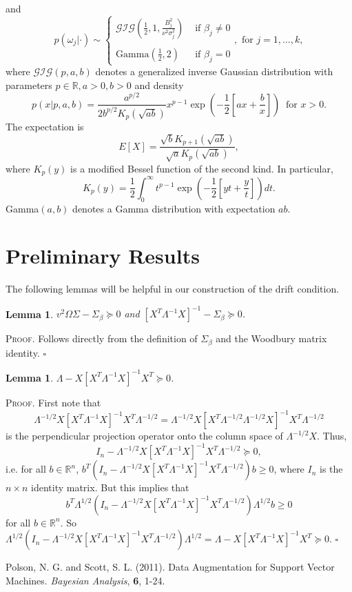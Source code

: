 \documentclass[12pt]{article}
\newtheorem{lemma}[theorem]{Lemma}
\newcounter{ProofCounter}
\newenvironment{Proof}{\stepcounter{ProofCounter}\textsc{Proof.}}{\hfill$\square$}
\begin{document}
and 
\[
  p(\omega_j|\cdot) \sim \left\{ \begin{array}{cl}
      \mathcal{GIG}\left( \frac{1}{2}, 1, \frac{B_j^2}{\nu^2\sigma_j^2} \right) & \text{ if } \beta_j \neq 0 \\ \\
      \text{Gamma}\left( \frac{1}{2}, 2 \right) & \text{ if } \beta_j = 0
  \end{array} \right.,
  \text{ for } j=1,\dots,k,
\]
where $\mathcal{GIG}(p, a, b)$ denotes a generalized inverse Gaussian distribution with parameters $p \in \mathbb{R}, a > 0, b > 0$ and density
\[
  p(x|p, a, b) = \frac{a^{p/2}}{2b^{p/2}K_{p}(\sqrt{ab})}x^{p - 1}\exp\left( -\frac{1}{2}\left[ ax + \frac{b}{x} \right] \right) \ \text{ for } x > 0.
\]
The expectation is
\[
  E[X] = \frac{\sqrt{b}K_{p+1}(\sqrt{ab})}{\sqrt{a}K_{p}(\sqrt{ab})},
\]
where $K_{p}(y)$ is a modified Bessel function of the second kind. In particular, 
\[
  K_p(y) = \frac{1}{2} \int_{0}^{\infty} t^{p-1}\exp\left( -\frac{1}{2}\left[yt + \frac{y}{t}\right] \right) dt.
\]
Gamma$(a,b)$ denotes a Gamma distribution with expectation $ab$.


\section{Preliminary Results}

The following lemmas will be helpful in our construction of the drift condition. \\

\begin{lemma}
  $v^2 \Omega \Sigma - \Sigma_{\beta} \succeq 0$ and $[X^T \Lambda^{-1}X]^{-1} - \Sigma_{\beta} \succeq 0$.
  \label{l1}
\end{lemma}
\begin{Proof}
  Follows directly from the definition of $\Sigma_{\beta}$ and the Woodbury matrix identity.
\end{Proof} \\

\begin{lemma}
  $\Lambda - X[X^T \Lambda^{-1} X]^{-1} X^T \succeq 0$.
  \label{l2}
\end{lemma}
\begin{Proof}
  First note that 
  \[
    \Lambda^{-1/2}X[X^T \Lambda^{-1} X]^{-1} X^T \Lambda^{-1/2} = \Lambda^{-1/2}X[X^T \Lambda^{-1/2}\Lambda^{-1/2} X]^{-1} X^T \Lambda^{-1/2}
  \]
  is the perpendicular projection operator onto the column space of $\Lambda^{-1/2}X$. Thus, 
  \[
    I_n - \Lambda^{-1/2}X[X^T \Lambda^{-1} X]^{-1} X^T \Lambda^{-1/2}  \succeq 0,
  \]
  i.e. for all $b \in \mathbb{R}^{n}$, $b^T(I_n - \Lambda^{-1/2}X[X^T \Lambda^{-1} X]^{-1} X^T \Lambda^{-1/2})b \geq 0$,
  where $I_n$ is the $n\times n$ identity matrix. But this implies that 
  \[
    b^{T}\Lambda^{1/2} (I_n - \Lambda^{-1/2}X[X^T \Lambda^{-1} X]^{-1} X^T \Lambda^{-1/2}) \Lambda^{1/2}b \geq 0
  \]
  for all $b \in \mathbb{R}^{n}$. So
  $\Lambda^{1/2}(I_n - \Lambda^{-1/2}X[X^T \Lambda^{-1} X]^{-1} X^T \Lambda^{-1/2})\Lambda^{1/2} = \Lambda - X[X^T \Lambda^{-1} X]^{-1}X^T \succeq 0$.
\end{Proof} \\



\newpage

\begin{thebibliography}{9}
    Polson, N. G. and Scott, S. L. (2011). Data Augmentation for Support Vector Machines. \emph{Bayesian Analysis}, \textbf{6}, 1-24.
\end{thebibliography}
\end{document}
